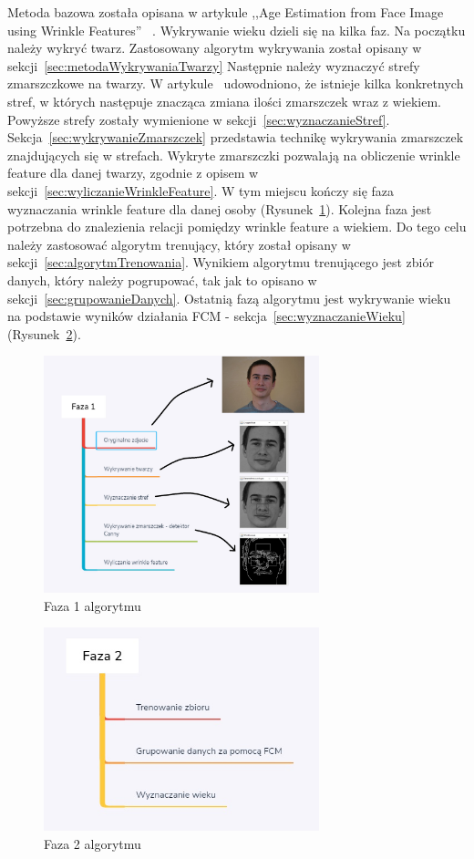 \documentclass[a4paper,twoside,12pt]{book}
\begin{document}
    Metoda bazowa została opisana w artykule ,,Age Estimation from Face Image using Wrinkle Features''
    ~\cite{wrinkleFeatures}.
    Wykrywanie wieku dzieli się na kilka faz.
    Na początku należy wykryć twarz.
    Zastosowany algorytm wykrywania został
    opisany w sekcji~\ref{sec:metodaWykrywaniaTwarzy}
    Następnie należy wyznaczyć strefy zmarszczkowe na twarzy.
    W artykule~\cite{wrinkleFeatures} udowodniono,
    że istnieje kilka konkretnych stref, w których następuje znacząca zmiana ilości zmarszczek wraz z wiekiem.
    Powyższe strefy zostały wymienione w sekcji~\ref{sec:wyznaczanieStref}.
    Sekcja~\ref{sec:wykrywanieZmarszczek} przedstawia technikę wykrywania zmarszczek znajdujących się w strefach.
    Wykryte zmarszczki
    pozwalają na obliczenie wrinkle feature dla danej twarzy, zgodnie z opisem w sekcji~\ref{sec:wyliczanieWrinkleFeature}.
    W tym miejscu kończy się faza wyznaczania wrinkle feature dla danej osoby (Rysunek~\ref{fig.faza1Algorytmu}).
    Kolejna faza
    jest potrzebna do
    znalezienia relacji pomiędzy wrinkle feature a wiekiem.
    Do tego celu należy zastosować algorytm trenujący, który
    został opisany w sekcji~\ref{sec:algorytmTrenowania}.
    Wynikiem algorytmu trenującego jest zbiór danych, który
    należy pogrupować, tak jak to opisano w sekcji~\ref{sec:grupowanieDanych}.
    Ostatnią fazą algorytmu jest wykrywanie wieku
    na podstawie wyników działania FCM - sekcja~\ref{sec:wyznaczanieWieku} (Rysunek~\ref{fig.faza2Algorytmu}).

    \begin{figure}[h]
        \centering
        \includegraphics[width=8cm]{Obrazy/Faza1.jpg}
        \caption{Faza 1 algorytmu}
        \label{fig.faza1Algorytmu}
    \end{figure}

    \begin{figure}[h]
        \centering
        \includegraphics[width=8cm]{Obrazy/Faza2.jpg}
        \caption{Faza 2 algorytmu}
        \label{fig.faza2Algorytmu}
    \end{figure}
\end{document}
